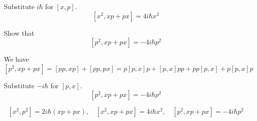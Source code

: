 Substitute $i\hbar$ for $[x,p]$.
\begin{equation*}
\left[x^2,xp+px\right]=4i\hbar x^2
\end{equation*}

Show that
\begin{equation*}
\left[p^2,xp+px\right]=-4i\hbar p^2
\tag{3}
\end{equation*}

We have
\begin{equation*}
\left[p^2,xp+px\right]=[pp,xp]+[pp,px]
=p[p,x]p+[p,x]pp+pp[p,x]+p[p,x]p
\end{equation*}

Substitute $-i\hbar$ for $[p,x]$.
\begin{equation*}
\left[p^2,xp+px\right]=-4i\hbar p^2
\end{equation*}




\begin{equation*}
\left[x^2,p^2\right]=2i\hbar(xp+px),\quad
\left[x^2,xp+px\right]=4i\hbar x^2,\quad
\left[p^2,xp+px\right]=-4i\hbar p^2
\end{equation*}


